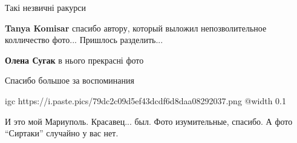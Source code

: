  
 
 
 
 

\qqSecCmt


Такі незвичні ракурси

\begin{itemize} %
\textbf{Tanya Komisar} спасибо автору, который выложил непозволительное колличество фото... Пришлось разделить...

\textbf{Олена Сугак} в нього прекрасні фото
\end{itemize} %


Спасибо большое за воспоминания


\ifcmt
  igc https://i.paste.pics/79dc2c09d5ef43dcdf6d8daa08292037.png
	@width 0.1
\fi


И это мой Мариуполь. Красавец... был. Фото изумительные, спасибо. А фото
\enquote{Сиртаки} случайно у вас нет.

